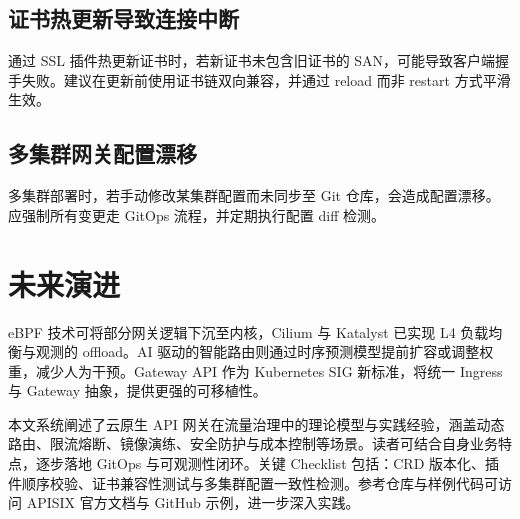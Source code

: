 \section{证书热更新导致连接中断}
通过 SSL 插件热更新证书时，若新证书未包含旧证书的 SAN，可能导致客户端握手失败。建议在更新前使用证书链双向兼容，并通过 reload 而非 restart 方式平滑生效。\par
\section{多集群网关配置漂移}
多集群部署时，若手动修改某集群配置而未同步至 Git 仓库，会造成配置漂移。应强制所有变更走 GitOps 流程，并定期执行配置 diff 检测。\par
\chapter{未来演进}
eBPF 技术可将部分网关逻辑下沉至内核，Cilium 与 Katalyst 已实现 L4 负载均衡与观测的 offload。AI 驱动的智能路由则通过时序预测模型提前扩容或调整权重，减少人为干预。Gateway API 作为 Kubernetes SIG 新标准，将统一 Ingress 与 Gateway 抽象，提供更强的可移植性。\par
本文系统阐述了云原生 API 网关在流量治理中的理论模型与实践经验，涵盖动态路由、限流熔断、镜像演练、安全防护与成本控制等场景。读者可结合自身业务特点，逐步落地 GitOps 与可观测性闭环。关键 Checklist 包括：CRD 版本化、插件顺序校验、证书兼容性测试与多集群配置一致性检测。参考仓库与样例代码可访问 APISIX 官方文档与 GitHub 示例，进一步深入实践。\par
